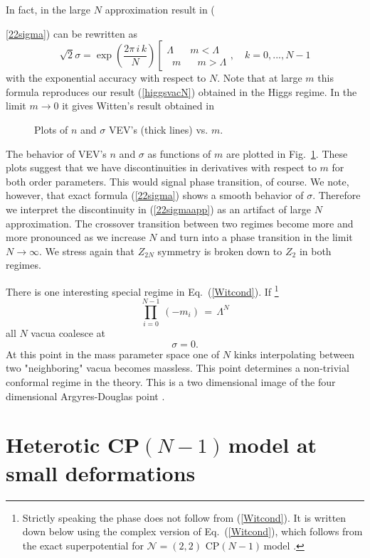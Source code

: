 \documentclass[epsfig,12pt]{article}
\def\beq{\begin{equation}}
\def\eeq{\end{equation}}
\newcommand{\cpn}{CP$(N-1)\,$}
\def\beq{\begin{equation}}
\def\eeq{\end{equation}}
\newcommand{\ntwot}{${\mathcal N}= \left(2,2\right) $ }
\begin{document}
In fact, in the large $N$ approximation result in ({\ref{22sigma}) can be rewritten as
\beq
\sqrt{2}\sigma =\exp\left( \frac{2\pi\,i\, k}{N}
\right)\left[
\begin{array}{cc}
\Lambda\;\;\;\;\;\;m <\Lambda\\
\;\;m\;\;\;\;\;\; m > \Lambda
\end{array},
\right.
 \quad k=0, ..., N-1
\label{22sigmaapp}
\eeq
with the exponential accuracy with respect to $N$. Note that at large $m$ this formula reproduces our
result (\ref{higgsvacN}) obtained in the Higgs regime. In the limit $m\to 0$ it gives Witten's
result obtained in \cite{W79}

\begin{figure}
\epsfxsize=7cm
\centerline{}
\caption{\small Plots of $n$ and $\sigma$ VEV's (thick lines) vs. $m$. }
\label{fig22nsigma}
\end{figure}

The behavior of VEV's $n$ and $\sigma$ as functions of $m$ are plotted in Fig.~\ref{fig22nsigma}.
These plots suggest that we have  discontinuities in derivatives with respect to $m$ for both order
parameters. This would signal phase transition, of course. We note, however, that exact formula
(\ref{22sigma}) shows a smooth behavior of $\sigma$. Therefore we interpret the discontinuity in
(\ref{22sigmaapp}) as an artifact of large $N$ approximation. The crossover transition between two
regimes become more and more pronounced as we increase $N$ and turn into a phase transition in the
limit $N\to\infty$. We stress again that $Z_{2N}$ symmetry is broken down to $Z_2$ in both regimes.

There is one interesting special regime in Eq.~(\ref{Witcond}). If \footnote{Strictly speaking 
the phase does not follow from (\ref{Witcond}). It is written down below using  the complex version of Eq.~(\ref{Witcond}), which follows from the exact superpotential for \ntwot \cpn model
\cite{AdDVecSal,ChVa,W93,HaHo,Dor}.}
\beq
\prod_{i=0}^{N-1}\,(-m_i) \,=\,\Lambda^N
\label{ADpoint}
\eeq
all $N$ vacua coalesce at  
\beq
\sigma=0.
\label{ADsigma}
\eeq
At this point in the mass parameter space one of $N$ kinks interpolating between two
"neighboring" vacua becomes massless. This point determines a non-trivial conformal regime in the
theory. This is a two dimensional image of the four dimensional
Argyres-Douglas point \cite{AD,APSW}.



\section{Heterotic \cpn model at small deformations}
\setcounter{equation}{0}



}
\end{document}
